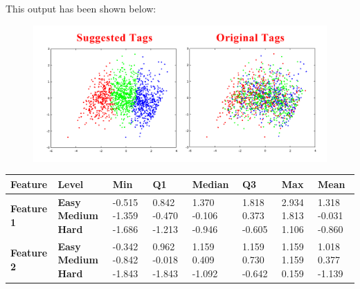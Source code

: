 \documentclass[12pt]{article}
\begin{document}
	This output has been shown below:
	\begin{figure}[h]
	\includegraphics[width=\textwidth]{ClusteringOutput}
	\end{figure}
	
	\begin{center}
	\begin{table}[h]
		\begin{tabular}{ | m{2cm} | m{1.7cm} | m{1.3cm} | m{1.3cm} | m{1.5cm} | m{1.3cm} | m{1.3cm} | m{1.3cm} | }
		\hline
		\textbf{Feature} & \textbf{Level} & \textbf{Min} & \textbf{Q1} & \textbf{Median} & \textbf{Q3} & \textbf{Max} & \textbf{Mean}\\ 
		\hline
		\textbf{Feature 1} & \textbf{Easy Medium Hard} & -0.515 \hspace{5mm}-1.359 \hspace{5mm}-1.686 & 0.842 \hspace{5mm}-0.470 \hspace{5mm}-1.213 & 1.370  \hspace{5mm}-0.106 \hspace{5mm}-0.946 & 1.818 \hspace{5mm}0.373 \hspace{5mm}-0.605 & 2.934 \hspace{5mm}1.813 \hspace{5mm}1.106 & 1.318 \hspace{5mm}-0.031 \hspace{5mm}-0.860\\
		\hline
		\textbf{Feature 2} & \textbf{Easy Medium Hard} & -0.342 \hspace{5mm}-0.842 \hspace{5mm}-1.843 & 0.962 \hspace{5mm}-0.018 \hspace{5mm}-1.843 & 1.159  \hspace{5mm}0.409 \hspace{5mm}-1.092 & 1.159 \hspace{5mm}0.730 \hspace{5mm}-0.642 & 1.159 \hspace{5mm}1.159 \hspace{5mm}0.159 & 1.018 \hspace{5mm}0.377 \hspace{5mm}-1.139\\

\end{tabular}
\end{table}
\end{center}
\end{document}
